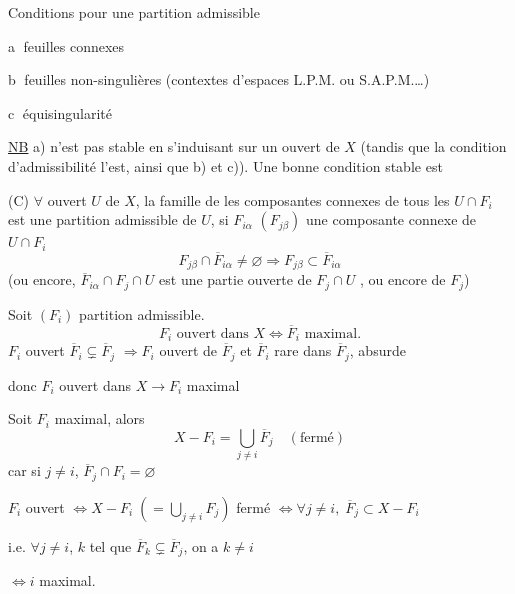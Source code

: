 Conditions pour une partition admissible

\textcircled{a} feuilles connexes

\textcircled{b} feuilles non-singulières (contextes d'espaces  L.P.M. ou S.A.P.M.\ldots)

\textcircled{c} équisingularité

\uline{NB} a) n'est pas stable en s'induisant sur un ouvert de $X$ (tandis que la condition d'admissibilité l'est, ainsi que b) et c)). Une bonne condition stable est


(C) $\forall$ ouvert $U$ de $X$, la famille de  les composantes connexes de tous les $U\cap F_i$ est une partition admissible de $U$,
  si $F_{i\alpha}$ $(F_{j\beta})$ une composante connexe de $U\cap F_i$  
\[
F_{j\beta}\cap\overline F_{i\alpha}\neq\varnothing
\Longrightarrow F_{j\beta}\subset\overline F_{i\alpha}
\]
(ou encore, $\overline F_{i\alpha}\cap F_j\cap U$ est une partie ouverte de $F_j\cap U$ , ou encore de $F_j$)

Soit $(F_i)$ partition admissible.
\[
F_i\text{ ouvert dans }X\Longleftrightarrow\overline F_i\text{ maximal.}
\]
$F_i$ ouvert  $\overline F_i\subsetneq\overline F_j$
$\Rightarrow F_i$ ouvert \inserted{$\neq\varnothing$} de $\overline F_j$ et $\overline F_i$ rare dans $\overline F_j$, absurde

donc $F_i$ ouvert dans $X\longrightarrow F_i$ maximal

Soit $F_i$ maximal, alors
\[
X-F_i=\bigcup_{j\neq i}\overline F_j\quad(\text{fermé})
\]
car  si $j\neq i$, $\overline F_j\cap F_i=\varnothing$

$F_i$ ouvert $\Longleftrightarrow X-F_i\;(=\bigcup_{j\neq i}F_j)$ fermé
$\Longleftrightarrow\forall j\neq i,\;\overline F_j\subset X-F_i$

i.e. $\forall j\neq i$,  $k$ tel que $\overline F_k\subsetneq\overline F_j$, on a $k\neq i$

$\Longleftrightarrow i$ maximal.

